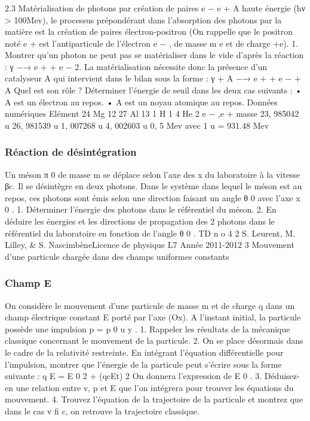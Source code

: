 \subsubsection{}
2.3 Matérialisation de photons par création de paires e − e +
A haute énergie (hν > 100Mev), le processus prépondérant dans l’absorption des photons par
la matière est la création de paires électron-positron (On rappelle que le positron noté e + est
l’antiparticule de l’électron e − , de masse m e et de charge +e).
1. Montrer qu’un photon ne peut pas se matérialiser dans le vide d’après la réaction :
γ
−→
e + + e −
2. La matérialisation nécessite donc la présence d’un catalyseur A qui intervient dans le bilan
sous la forme :
γ + A −→ e + + e − + A
Quel est son rôle ?
Déterminer l’énergie de seuil dans les deux cas suivants :
• A est un électron au repos.
• A est un noyau atomique au repos.
Données numériques
Elément
24 Mg
12
27 Al
13
1 H
1
4 He
2
e − ,e +
masse
23, 985042 u
26, 981539 u
1, 007268 u
4, 002603 u
0, 5 Mev
avec 1 u = 931.48 Mev
\subsubsection{Réaction de désintégration}%
Un méson π 0 de masse m se déplace selon l’axe des x du laboratoire à la vitesse βc. Il se
désintègre en deux photons. Dans le système dans lequel le méson est au repos, ces photons
sont émis selon une direction faisant un angle θ 0 avec l’axe x 0 .
1. Déterminer l’énergie des photons dans le référentiel du méson.
2. En déduire les énergies et les directions de propagation des 2 photons dans le référentiel
du laboratoire en fonction de l’angle θ 0 .
TD n o 4
2
S. Leurent, M. Lilley, & S. NascimbèneLicence de physique
L7
Année 2011-2012
3 Mouvement d’une particule chargée dans des champs uniformes
constants
\subsubsection{Champ E}%
On considère le mouvement d’une particule de masse m et de charge q dans un champ électrique
constant E porté par l’axe (Ox). A l’instant initial, la particule possède une impulsion p = p 0 u y .
1. Rappeler les résultats de la mécanique classique concernant le mouvement de la particule.
2. On se place désormais dans le cadre de la relativité restreinte. En intégrant l’équation
différentielle pour l’impulsion, montrer que l’énergie de la particule peut s’écrire sous la
forme suivante :
q
E = E 0 2 + (qcEt) 2
On donnera l’expression de E 0 .
3. Déduisez-en une relation entre v, p et E que l’on intégrera pour trouver les équations du
mouvement.
4. Trouvez l’équation de la trajectoire de la particule et montrez que dans le cas v fi c, on
retrouve la trajectoire classique.
